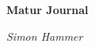 \thispagestyle{empty}

\begin{center}
	\vfill
    \vspace*{0.4\textheight}

	\Huge
	\bf{Matur Journal}
    
	\Large
	\it{Simon Hammer}
	
    \normalsize
    
 \end{center}
